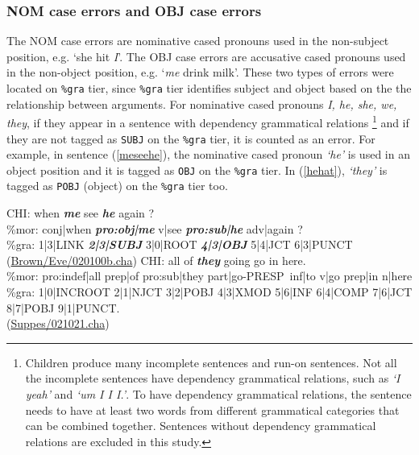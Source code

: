 \subsubsection{NOM case errors and OBJ case errors}
The NOM case errors are nominative cased pronouns used in the non-subject position, e.g. `she hit \textit{I}'. The OBJ case errors are accusative cased pronouns used in the non-object position, e.g. `\textit{me} drink milk'. These two types of errors were located on \texttt{\%gra} tier, since \texttt{\%gra} tier identifies subject and object based on the the relationship between arguments. For nominative cased pronouns \textit{I, he, she, we, they}, if they appear in a sentence with dependency grammatical relations \footnote{Children produce many incomplete sentences and run-on sentences. Not all the incomplete sentences have dependency grammatical relations, such as \textit{`I yeah'} and \textit{`um I I I.'}. To have dependency grammatical relations, the sentence needs to have at least two words from different grammatical categories that can be combined together. Sentences without dependency grammatical relations are excluded in this study.} 
and if they are not tagged as \texttt{SUBJ} on the \texttt{\%gra} tier, it is counted as an error. For example, in sentence (\ref{meseehe}), the nominative cased pronoun \textit{`he'} is used in an object position and it is tagged as \texttt{OBJ} on the \texttt{\%gra} tier. In (\ref{hehat}), \textit{`they'} is tagged as \texttt{POBJ} (object) on the \texttt{\%gra} tier too. 
\begin{exe}
\ex \label{meseehe}\gll *CHI: when \textit{\textbf{me}} see \textit{\textbf{he}} again ?\\
\%mor: conj|when \textit{\textbf{pro:obj|me}} v|see \textit{\textbf{pro:sub|he}} adv|again ? \\
\%gra: 1|3|LINK \textbf{\textit{2|3|SUBJ}} 3|0|ROOT \textit{\textbf{4|3|OBJ}} 5|4|JCT 6|3|PUNCT \\
(\href{https://childes.talkbank.org/browser/index.php?url=Eng-NA/Brown/Eve/020100b.cha}{Brown/Eve/020100b.cha})
\ex \label{hehat}\gll *CHI: all of \textit{\textbf{they}} going go in here.\\
\%mor: pro:indef|all prep|of pro:sub|they part|go-PRESP~inf|to v|go prep|in n|here\\
\%gra: 1|0|INCROOT 2|1|NJCT 3|2|POBJ 4|3|XMOD 5|6|INF 6|4|COMP 7|6|JCT 8|7|POBJ 9|1|PUNCT.\\
(\href{https://childes.talkbank.org/browser/index.php?url=Eng-NA/Suppes/021021.cha}{Suppes/021021.cha})
\end{exe}
